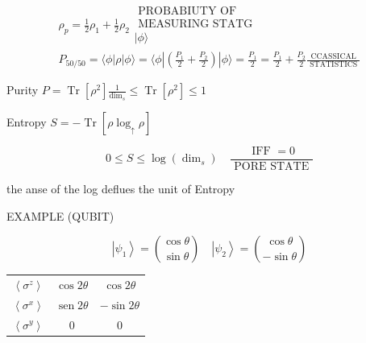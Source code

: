 \documentclass[10pt]{article}
\begin{document}
$$
\begin{array}{r}
\rho_{p}=\frac{1}{2} \rho_{1}+\frac{1}{2} \rho_{2} \begin{array}{c}
\text { PROBABIUTY OF } \\
\text { MEASURING STATG } \\
|\phi\rangle
\end{array} \\
P_{50 / 50}=\langle\phi| \rho|\phi\rangle=\langle\phi|\left(\frac{P_{1}}{2}+\frac{P_{2}}{2}\right)|\phi\rangle=\frac{P_{1}}{2}=\frac{P_{1}}{2}+\frac{P_{2}}{2} \frac{\text { CCASSICAL }}{\text { STATISTICS }}
\end{array}
$$

Purity $P=\operatorname{Tr}\left[\rho^{2}\right] \frac{1}{\operatorname{dim}_{s}} \leqslant \operatorname{Tr}\left[\rho^{2}\right] \leqslant 1$

Entropy $S=-\operatorname{Tr}\left[\rho \log _{\uparrow} \rho\right]$

$$
0 \leqslant S \leqslant \log \left(\operatorname{dim}_{s}\right) \quad \frac{\text { IFF }=0}{\text { PORE STATE }}
$$

the anse of the log deflues the unit of Entropy

EXAMPLE (QUBIT)

$$
\left|\psi_{1}\right\rangle=\binom{\cos \theta}{\sin \theta} \quad\left|\psi_{2}\right\rangle=\binom{\cos \theta}{-\sin \theta}
$$

\begin{center}
\begin{tabular}{ccc}
$\left\langle\sigma^{z}\right\rangle$ & $\cos 2 \theta$ & $\cos 2 \theta$ \\
$\left\langle\sigma^{x}\right\rangle$ & $\operatorname{sen} 2 \theta$ & $-\sin 2 \theta$ \\
$\left\langle\sigma^{y}\right\rangle$ & 0 & 0 \\
\end{tabular}
\end{center}
\end{document}
